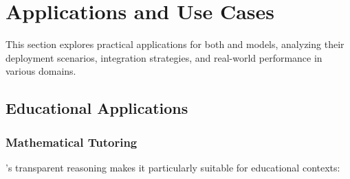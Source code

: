 \section{Applications and Use Cases}
\label{sec:applications}

This section explores practical applications for both \supra{} and \zennano{} models, analyzing their deployment scenarios, integration strategies, and real-world performance in various domains.

\subsection{Educational Applications}

\subsubsection{Mathematical Tutoring}

\supra{}'s transparent reasoning makes it particularly suitable for educational contexts:

